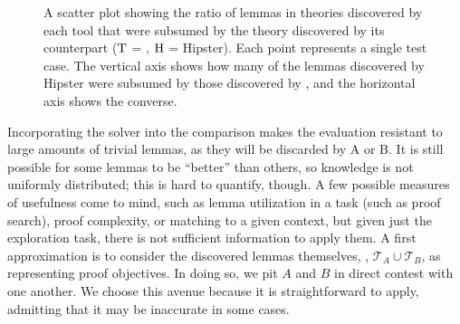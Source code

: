 \begin{figure}[t]
    
%
\vspace{-2em}  %
    \caption{A scatter plot showing the ratio of lemmas in theories discovered by each tool that were subsumed by the theory discovered by its counterpart ($\textrm{T}$ = \TheSy, $\textrm{H}$ = Hipster). Each point represents a single test case.
    The vertical axis shows how many of the lemmas discovered by Hipster were subsumed by those discovered by \TheSy, and the horizontal axis shows the converse.}
    \label{results:ratio_chart}
\end{figure}

Incorporating the solver into the comparison makes the evaluation resistant to large amounts of trivial lemmas, as they will be discarded by A or B.
It is still possible for some lemmas to be ``better'' than others, so knowledge is not uniformly distributed; this is hard to quantify, though.
A few possible measures of usefulness come to mind, such as lemma utilization in a task (such as proof search), proof complexity, or matching to a given context, but given just the exploration task, there is not sufficient information to apply them.
A first approximation is to consider the discovered lemmas themselves, \ie,
$\mathcal{T}_A \cup \mathcal{T}_B$, as representing proof objectives.
In doing so, we pit $A$ and $B$ in direct contest with one another.
We choose this avenue because it is straightforward to apply, admitting that it may be inaccurate in some cases.

